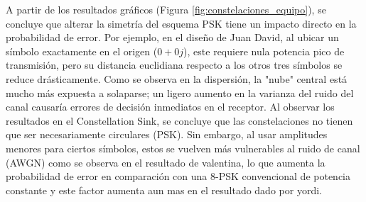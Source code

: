 A partir de los resultados gráficos (Figura \ref{fig:constelaciones_equipo}), se concluye que alterar la simetría del esquema PSK tiene un impacto directo en la probabilidad de error. Por ejemplo, en el diseño de Juan David, al ubicar un símbolo exactamente en el origen ($0+0j$), este requiere nula potencia pico de transmisión, pero su distancia euclidiana respecto a los otros tres símbolos se reduce drásticamente. Como se observa en la dispersión, la "nube" central está mucho más expuesta a solaparse; un ligero aumento en la varianza del ruido del canal causaría errores de decisión inmediatos en el receptor.
Al observar los resultados en el Constellation Sink, se concluye que las constelaciones no tienen que ser necesariamente circulares (PSK). Sin embargo, al usar amplitudes menores para ciertos símbolos, estos se vuelven más vulnerables al ruido de canal (AWGN) como se observa en el resultado de valentina, lo que aumenta la probabilidad de error en comparación con una 8-PSK convencional de potencia constante y este factor aumenta aun mas en el resultado dado por yordi.